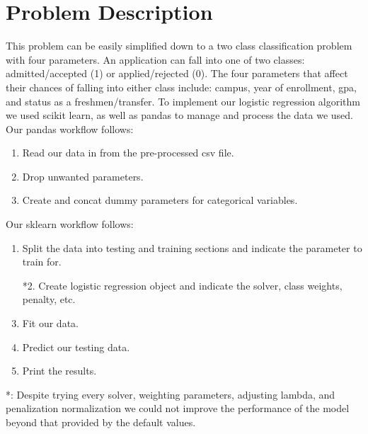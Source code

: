 \documentclass{article}
\begin{document}
\section{Problem Description}
This problem can be easily simplified down to a two class classification problem with four parameters. An application can fall into one of two classes: admitted/accepted (1) or applied/rejected (0). The four parameters that affect their chances of falling into either class include: campus, year of enrollment, gpa, and status as a freshmen/transfer. To implement our logistic regression algorithm we used scikit learn, as well as pandas to manage and process the data we used. \newline
Our pandas workflow follows:
\begin{enumerate}
    \item Read our data in from the pre-processed csv file.
    \item Drop unwanted parameters.
    \item Create and concat dummy parameters for categorical variables.
\end{enumerate}
Our sklearn workflow follows:
\begin{enumerate}
    \item Split the data into testing and training sections and indicate the parameter to train for.
    \item [*2.] Create logistic regression object and indicate the solver, class weights, penalty, etc.
    \item Fit our data.
    \item Predict our testing data.
    \item Print the results.
\end{enumerate}

*: Despite trying every solver, weighting parameters, adjusting lambda, and penalization normalization we could not improve the performance of the model beyond that provided by the default values. \newline \newline 
\end{document}
